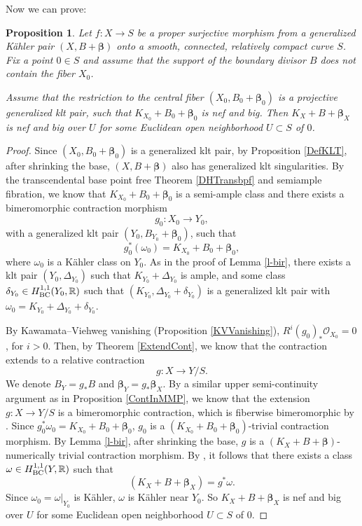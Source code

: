 \documentclass[12pt]{amsart}
\numberwithin{equation}{section}
\newtheorem{proposition}[theorem]{Proposition}
\theoremstyle{definition}
\theoremstyle{plain}
\newtheorem*{thm A*}{Theorem A}
\newtheorem*{thm B*}{Theorem B}
\newtheorem*{thm C*}{Theorem C}
\newtheorem*{thm D*}{Theorem D}
\theoremstyle{definition}
\renewcommand{\1}{\mathds{1}}
\newcommand{\bbeta}{\boldsymbol{\beta}}
\renewcommand{\>}{\rightarrow}
\newcommand{\R}{\mathbb R}
\begin{document}
Now we can prove:
\begin{proposition}\label{Extbigandnef}
Let $f:X\to S$ be a proper surjective morphism from a %
generalized K\"ahler pair $(X,B +  { \boldsymbol{\beta}})$ onto a smooth, connected, relatively compact curve $S$. Fix a point $0\in S$ and assume that the support of the boundary divisor $B$ does not contain the fiber $X_0$. 

Assume that the restriction to the central fiber $(X_0,B_0 +  { \boldsymbol{\beta}}_0)$ is a projective  generalized klt pair, such that $K_{X_0}+B_0 +  { {\bbeta}}_0$ is nef and big. Then $K_{X}  + B +  { {\bbeta}_X}$ is nef and big over $U$ for some Euclidean open neighborhood $U\subset S$ of $0$. 
\end{proposition}
\begin{proof}
Since $(X_0, B_0 + \bbeta_0)$ is a generalized klt pair, by Proposition \ref{DefKLT}, after shrinking the base, $(X,B + \bbeta)$ also has generalized klt singularities. 
By the transcendental base point free Theorem \ref{DHTransbpf} and semiample fibration, we know that $K_{X_0} + B_0 +  { {\bbeta}}_0$ is a semi-ample class and there exists a bimeromorphic contraction morphism  $$g_0: X_0 \to Y_0,$$ with a generalized klt pair $(Y_0, B_{Y_0} +  { \boldsymbol{\beta}}_0)$, such that $$g_0^* (\omega_0) = K_{X_0 } +B_0+  { {\bbeta}}_0,$$ where $\omega_0$ is a K\"ahler class on $Y_0$. As in the proof of Lemma \ref{l-bir}, there exists a klt pair $(Y_0, \Delta_{Y_0})$ such that $K_{Y_0} + \Delta_{Y_0}$ is ample, and some class $\delta_{Y_0} \in H^{1,1}_{\rm{BC}}(Y_0 , \mathbb{R})$ such that $(K_{Y_0}, \Delta_{Y_0} + {\delta}_{Y_0})$ is a generalized klt pair with $\omega_0 = K_{Y_0}+ \Delta_{Y_0} +\delta_{Y_0}$. 

By Kawamata--Viehweg vanishing (Proposition \ref{KVVanishing}), $R^i (g_0)_* \mathcal{O}_{X_0} = 0$, for $i>0$. Then, by Theorem \ref{ExtendCont}, we know that the contraction extends to a relative contraction $$g:X\to Y/S.$$
We denote $B_Y = g_* B$ and $ { {\bbeta}}_Y = g_*  { {\bbeta}_X}$. By a similar upper semi-continuity argument as in Proposition \ref{ContInMMP}, we know that the extension $g:X\to Y/S$ is a bimeromorphic contraction, which is fiberwise bimeromorphic by \cite[Corollary 3.2]{CRC25}. 
Since $g_0^* \omega_0 = K_{X_0}+ B_0 +  { {\bbeta}}_0$, $g_0$ is a $(K_{X_0}+ B_0+  { {\bbeta}}_0)$-trivial contraction morphism. By Lemma \ref{l-bir}, after shrinking the base,  $g$ is a $(K_X+ B+ { {\bbeta}})$-numerically trivial contraction morphism. 
By \cite[Lemma 2.6]{DH24MMP}, it follows that there exists a class $\omega\in H^{1,1}_{\rm{BC}}(Y,\R)$ such that  $$(K_X+B + { {\bbeta}_X} ) = g^* \omega.$$
Since $\omega_{0}=\omega|_{Y_0}$ is K\"ahler, $\omega$ is K\"ahler near $Y_0$. So $K_X+B+ \bbeta_X$ is nef and big over $U$ for some Euclidean open neighborhood $U\subset S$ of $0$. 
\end{proof}
\end{document}
